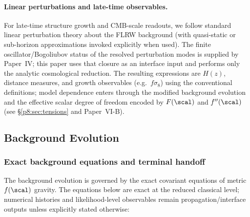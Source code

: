 \documentclass[12pt,a4paper]{article}
\begin{document}
\paragraph{Linear perturbations and late-time observables.}
For late-time structure growth and CMB-scale readouts, we follow standard
linear perturbation theory about the FLRW background (with quasi-static or
sub-horizon approximations invoked explicitly when used).  The finite oscillator/Bogoliubov status of the resolved perturbation modes is supplied by Paper~IV; this paper uses that closure as an interface input and performs only the analytic cosmological reduction.  The resulting expressions are
$H(z)$, distance measures, and growth observables (e.g.\ $f\sigma_8$) using
the conventional definitions; model dependence enters through the modified
background evolution and the effective scalar degree of freedom encoded by
$F(\scal)$ and $f''(\scal)$ (see \S\ref{p8:sec:tensions} and
Paper~VI-B).


\subsection{Background Evolution}
\label{p8:sec:background-evolution}

\subsubsection{Exact background equations and terminal handoff}
\label{p8:sec:background-equations-determinant-transport}
The background evolution is governed by the exact covariant equations of metric $f(\scal)$ gravity. The equations below are exact at the reduced classical level; numerical histories and likelihood-level observables remain propagation/interface outputs unless explicitly stated otherwise:
\end{document}
